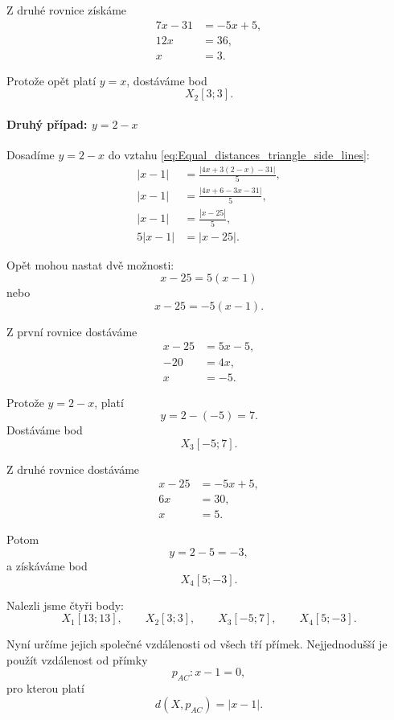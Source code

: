 \begin{example}
    Z druhé rovnice získáme
    \begin{align*}
        7x-31&=-5x+5,\\
        12x&=36,\\
        x&=3.
    \end{align*}

    Protože opět platí $y=x$, dostáváme bod
    \[
        X_2[3;3].
    \]

    \paragraph{Druhý případ: $y=2-x$}

    Dosadíme $y=2-x$ do vztahu
    \eqref{eq:Equal_distances_triangle_side_lines}:
    \begin{align*}
        |x-1|
        &=
        \frac{|4x+3(2-x)-31|}{5},\\
        |x-1|
        &=
        \frac{|4x+6-3x-31|}{5},\\
        |x-1|
        &=
        \frac{|x-25|}{5},\\
        5|x-1|
        &=
        |x-25|.
    \end{align*}

    Opět mohou nastat dvě možnosti:
    \[
        x-25=5(x-1)
    \]
    nebo
    \[
        x-25=-5(x-1).
    \]

    Z první rovnice dostáváme
    \begin{align*}
        x-25&=5x-5,\\
        -20&=4x,\\
        x&=-5.
    \end{align*}

    Protože $y=2-x$, platí
    \[
        y=2-(-5)=7.
    \]
    Dostáváme bod
    \[
        X_3[-5;7].
    \]

    Z druhé rovnice dostáváme
    \begin{align*}
        x-25&=-5x+5,\\
        6x&=30,\\
        x&=5.
    \end{align*}

    Potom
    \[
        y=2-5=-3,
    \]
    a získáváme bod
    \[
        X_4[5;-3].
    \]

    Nalezli jsme čtyři body:
    \[
        X_1[13;13],
        \qquad
        X_2[3;3],
        \qquad
        X_3[-5;7],
        \qquad
        X_4[5;-3].
    \]

    Nyní určíme jejich společné vzdálenosti od všech tří přímek.
    Nejjednodušší je použít vzdálenost od přímky
    \[
        p_{AC}:x-1=0,
    \]
    pro kterou platí
    \[
        d(X,p_{AC})=|x-1|.
    \]


\end{example}
